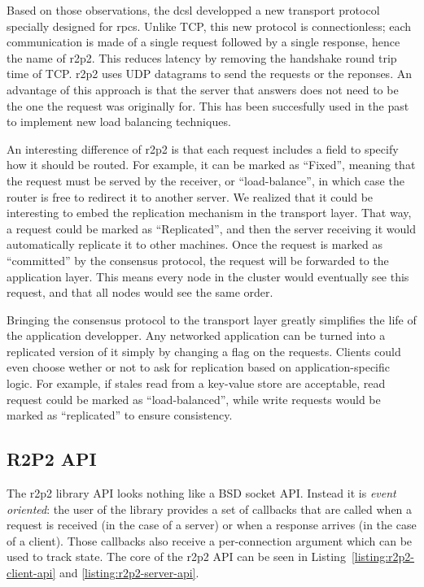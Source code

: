 Based on those observations, the \gls{dcsl} developped a new transport protocol specially designed for \glspl{rpc}.
Unlike TCP, this new protocol is connectionless; each communication is made of a single request followed by a single response, hence the name of \gls{r2p2}.
This reduces latency by removing the handshake round trip time of TCP.
\gls{r2p2} uses UDP datagrams to send the requests or the reponses.
An advantage of this approach is that the server that answers does not need to be the one the request was originally for.
This has been succesfully used in the past to implement new load balancing techniques\cite{r2p2}.

An interesting difference of \gls{r2p2} is that each request includes a field to specify how it should be routed.
For example, it can be marked as ``Fixed'', meaning that the request must be served by the receiver, or ``load-balance'', in which case the router is free to redirect it to another server.
We realized that it could be interesting to embed the replication mechanism in the transport layer.
That way, a request could be marked as ``Replicated'', and then the server receiving it would automatically replicate it to other machines.
Once the request is marked as ``committed'' by the consensus protocol, the request will be forwarded to the application layer.
This means every node in the cluster would eventually see this request, and that all nodes would see the same order.

Bringing the consensus protocol to the transport layer greatly simplifies the life of the application developper.
Any networked application can be turned into a replicated version of it simply by changing a flag on the requests.
Clients could even choose wether or not to ask for replication based on application-specific logic.
For example, if stales read from a key-value store are acceptable, read request could be marked as ``load-balanced'', while write requests would be marked as ``replicated'' to ensure consistency.

\subsection{R2P2 API}

The \gls{r2p2} library API looks nothing like a BSD socket API.
Instead it is \emph{event oriented}: the user of the library provides a set of callbacks that are called when a request is received (in the case of a server) or when a response arrives (in the case of a client).
Those callbacks also receive a per-connection argument which can be used to track state.
The core of the \gls{r2p2} API can be seen in Listing~\ref{listing:r2p2-client-api} and \ref{listing:r2p2-server-api}.

